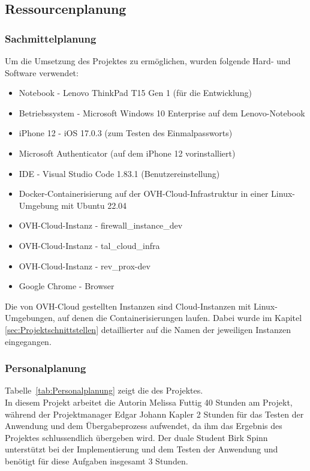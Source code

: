 \subsection{Ressourcenplanung}
\label{sec:Ressourcenplanung}

\subsubsection{Sachmittelplanung}
\label{sec:Sachmittelplanung}
Um die Umsetzung des Projektes zu ermöglichen, wurden folgende Hard- und Software verwendet:
\begin{itemize} [label=--]
	\item Notebook - Lenovo ThinkPad T15 Gen 1 (für die Entwicklung)
	\item Betriebssystem - Microsoft Windows 10 Enterprise auf dem Lenovo-Notebook
	\item iPhone 12 - iOS 17.0.3 (zum Testen des Einmalpassworts)
	\item Microsoft Authenticator (auf dem iPhone 12 vorinstalliert)
	\item \acs{IDE} - Visual Studio Code 1.83.1 (Benutzereinstellung)
	\item Docker-Containerisierung auf der OVH-Cloud-Infrastruktur in einer Linux-Umgebung mit Ubuntu 22.04
	\item OVH-Cloud-Instanz - firewall\_instance\_dev
	\item OVH-Cloud-Instanz - tal\_cloud\_infra
	\item OVH-Cloud-Instanz - rev\_prox-dev
	\item Google Chrome - Browser
\end{itemize}
Die von OVH-Cloud gestellten Instanzen sind Cloud-Instanzen mit Linux-Umgebungen, auf denen 
die Containerisierungen laufen. Dabei wurde im Kapitel \ref{sec:Projektschnittstellen} 
 detaillierter auf die Namen der jeweiligen Instanzen eingegangen.

\subsubsection{Personalplanung}
\label{sec:Personalplanung}
Tabelle~\ref{tab:Personalplanung} zeigt die  des Projektes.
\\
In diesem Projekt arbeitet die Autorin Melissa Futtig 40 Stunden am Projekt, während der Projektmanager 
Edgar Johann Kapler 2 Stunden für das Testen der Anwendung und dem Übergabeprozess aufwendet, da ihm 
das Ergebnis des Projektes schlussendlich übergeben wird. Der duale Student Birk Spinn unterstützt bei 
der Implementierung und dem Testen der Anwendung und benötigt für diese Aufgaben insgesamt 3 Stunden.

